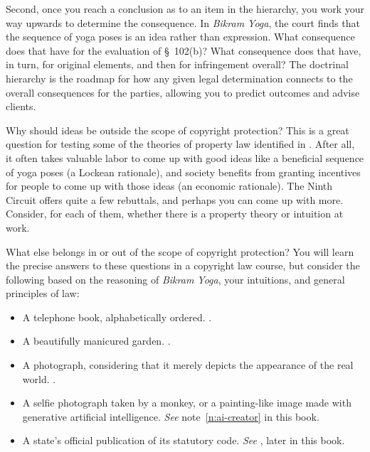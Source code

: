 Second, once you reach a conclusion as to an item in the hierarchy, you work
your way upwards to determine the consequence. In \emph{Bikram Yoga}, the court
finds that the sequence of yoga poses is an idea rather than expression. What
consequence does that have for the evaluation of \S~102(b)? What consequence
does that have, in turn, for original elements, and then for infringement
overall? The doctrinal hierarchy is the roadmap for how any given legal
determination connects to the overall consequences for the parties, allowing you
to predict outcomes and advise clients.

\item Why should ideas be outside the scope of copyright protection? This is a
great question for testing some of the theories of property law identified in
. After all, it often takes valuable labor to
come up with good ideas like a beneficial sequence of yoga poses (a Lockean
rationale), and society benefits from granting incentives for people to come up
with those ideas (an economic rationale). The Ninth Circuit offers quite a few
rebuttals, and perhaps you can come up with more. Consider, for each of them,
whether there is a property theory or intuition at work.


\item What else belongs in or out of the scope of copyright protection? You will
learn the precise answers to these questions in a copyright law course, but
consider the following based on the reasoning of \emph{Bikram Yoga}, your
intuitions, and general principles of law:
\begin{itemize}
\HiNoId
\item A telephone book, alphabetically ordered. .
\item A beautifully manicured garden. .
\item A photograph, considering that it merely depicts the appearance of the
real world. .
\item A selfie photograph taken by a monkey, or a painting-like image made with
generative artificial intelligence. \emph{See} note~\ref{n:ai-creator} in this
book.
\item A state's official publication of its statutory code. \emph{See}
, later in this book.
\end{itemize}

